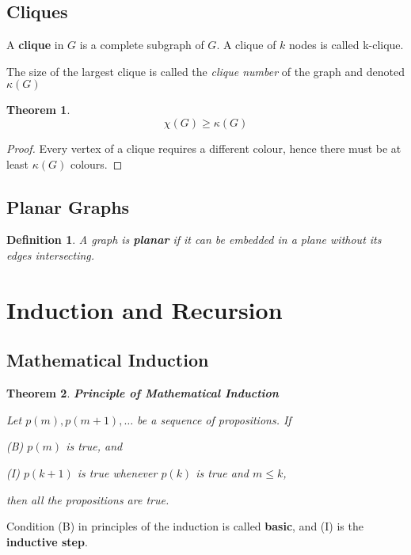 \documentclass{ctexart}
\newtheorem{theorem}{\indent Theorem}[section]
\newtheorem{definition}{\indent Definition}[section]
\begin{document}
\subsection{Cliques}

A \textbf{clique} in $G$ is a complete subgraph of $G$. A clique of $k$ nodes is called k-clique.

The size of the largest clique is called the \textit{clique number} of the graph and denoted $\kappa (G)$

\begin{theorem}
    \[
        \chi (G) \geq \kappa (G)
    \]
\end{theorem}

\begin{proof}
    Every vertex of a clique requires a different colour, hence there must be at least $\kappa (G)$ colours.
\end{proof}

\subsection{Planar Graphs}

\begin{definition}
    A graph is \textbf{planar} if it can be embedded in a plane without its edges intersecting.
\end{definition}

\section{Induction and Recursion}
\subsection{Mathematical Induction}

\begin{theorem}
    \textbf{Principle of Mathematical Induction}  
    
    Let $p(m),p(m+1), \ldots$ be a sequence of propositions. If

    (B) \quad $p(m)$ is true, and

    (I) \quad $p(k+1)$ is true whenever $p(k)$ is true and $m \leqslant  k$,

    then all the propositions are true.
\end{theorem}
Condition (B) in principles of the induction is called \textbf{basic}, and (I) is the \textbf{inductive step}.
\end{document}
